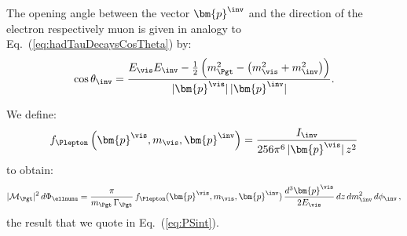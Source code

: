 The opening angle between the vector $\bm{p}^{\inv}$ and the direction
of the electron respectively muon is given in analogy to Eq.~(\ref{eq:hadTauDecaysCosTheta}) by:
\begin{equation}
\cos\theta_{\inv} = \frac{E_{\vis} E_{\inv} - \frac{1}{2} \left(m^{2}_{\Pgt} - \left( m^{2}_{\vis} + m^{2}_{\inv} \right) \right)}{\vert\bm{p}^{\vis}\vert \, 
  \vert\bm{p}^{\inv}\vert}.
\label{eq:lepTauDecaysCosTheta}
\end{equation}

We define:
\begin{equation}
f_{\Plepton}\left(\bm{p}^{\vis}, m_{\vis}, \bm{p}^{\inv}\right) = 
\frac{I_{\inv}}{256\pi^{6} \, \vert\bm{p}^{\vis}\vert \, z^{2}}
\label{eq:lepTauDecays_f}
\end{equation}
to obtain:
\begin{equation}
\vert\mathcal{M}_{\Pgt}\vert^{2} \,
 d\Phi_{\ellnunu} = \frac{\pi}{m_{\Pgt} \, \Gamma_{\Pgt}} \,
 f_{\Plepton}(\bm{p}^{\vis}, m_{\vis}, \bm{p}^{\inv}) \, \frac{d^{3}\bm{p}^{\vis}}{2 E_{\vis}} \, dz \, dm^{2}_{\inv} \, d\phi_{\inv}
 \, ,
\end{equation}
the result that we quote in Eq.~(\ref{eq:PSint}).

